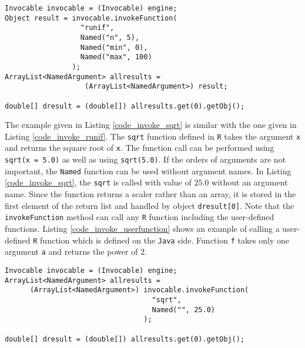 \documentclass[10pt,a4paper, final, oneside]{article}
\begin{document}
\begin{minipage}{\linewidth}
\begin{lstlisting}[caption=Invoking runif,label=code_invoke_runif]
Invocable invocable = (Invocable) engine;
Object result = invocable.invokeFunction(
                  "runif",
                  Named("n", 5),
                  Named("min", 0),
                  Named("max", 100)
                );
ArrayList<NamedArgument> allresults = 
                   (ArrayList<NamedArgument>) result;

double[] dresult = (double[]) allresults.get(0).getObj();
\end{lstlisting}
\end{minipage}

The example given in Listing \ref{code_invoke_sqrt} is similar with the one given in Listing \ref{code_invoke_runif}. The \texttt{sqrt} function defined in \texttt{R} takes the argument \texttt{x} and returns the square root of \texttt{x}. The function call can be performed using \texttt{sqrt(x = 5.0)} as well as using \texttt{sqrt(5.0)}. If the orders of arguments are not important, the \texttt{Named} function can be used without argument names. In Listing \ref{code_invoke_sqrt}, the \texttt{sqrt} is called with value of $25.0$ without an argument name. Since the function returns a scaler rather than an array, it is stored in the first element of the return list and handled by object \texttt{dresult[0]}. Note that the \texttt{invokeFunction} method can call any \texttt{R} function including the user-defined functions. Listing \ref{code_invoke_userfunction} shows an example of calling a user-defined \texttt{R} function which is defined on the \texttt{Java} side. Function \texttt{f} takes only one argument \texttt{a} and returns the power of $2$.

\begin{minipage}{\linewidth}
\begin{lstlisting}[caption=Invoking sqrt,label=code_invoke_sqrt]
Invocable invocable = (Invocable) engine;
ArrayList<NamedArgument> allresults = 
      (ArrayList<NamedArgument>) invocable.invokeFunction(
                                   "sqrt", 
                                   Named("", 25.0)
                                 );
                                 
double[] dresult = (double[]) allresults.get(0).getObj();
\end{lstlisting}
\end{minipage}
        
\end{document}

